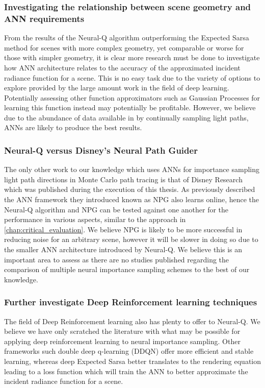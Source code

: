 \documentclass[../dissertation.tex]{subfiles}
\begin{document}
\subsubsection{Investigating the relationship between scene geometry and ANN requirements}

From the results of the Neural-Q algorithm outperforming the Expected Sarsa method for scenes with more complex geometry, yet comparable or worse for those with simpler geometry, it is clear more research must be done to investigate how ANN architecture relates to the accuracy of the approximated incident radiance function for a scene. This is no easy task due to the variety of options to explore provided by the large amount work in the field of deep learning. Potentially assessing other function approximators such as Gaussian Processes for learning this function instead may potentially be profitable. However, we believe due to the abundance of data available in by continually sampling light paths, ANNs are likely to produce the best results. 

\subsubsection{Neural-Q versus Disney's Neural Path Guider}

The only other work to our knowledge which uses ANNs for importance sampling light path directions in Monte Carlo path tracing is that of Disney Research which was published during the execution of this thesis. As previously described the ANN framework they introduced known as NPG also learns online, hence the Neural-Q algorithm and NPG can be tested against one another for the performance in various aspects, similar to the approach in \ref{chap:critical_evaluation}. We believe NPG is likely to be more successful in reducing noise for an arbitrary scene, however it will be slower in doing so due to the smaller ANN architecture introduced by Neural-Q. We believe this is an important area to assess as there are no studies published regarding the comparison of multiple neural importance sampling schemes to  the best of our knowledge.

\subsubsection{Further investigate Deep Reinforcement learning techniques}

The field of Deep Reinforcement learning also has plenty to offer to Neural-Q. We believe we have only scratched the literature with what may be possible for applying deep reinforcement learning to neural importance sampling. Other frameworks such double deep q-learning (DDQN) offer more efficient and stable learning, whereas deep Expected Sarsa better translates to the rendering equation leading to a loss function which will train the ANN to better approximate the incident radiance function for a scene.
\end{document}
